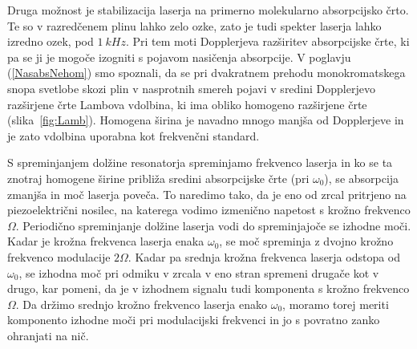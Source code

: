 Druga možnost je stabilizacija laserja na primerno molekularno absorpcijsko
črto. Te so v razredčenem plinu lahko zelo ozke, zato je tudi spekter 
laserja lahko izredno ozek, pod $1~\si{kHz}$. 
Pri tem moti Dopplerjeva razširitev absorpcijske črte,
ki pa se ji je mogoče izogniti s pojavom nasičenja 
absorpcije. V poglavju
(\ref{NasabsNehom}) smo spoznali, da se pri dvakratnem prehodu
monokromatskega snopa svetlobe skozi plin v nasprotnih smereh pojavi v
sredini Dopplerjevo razširjene črte Lambova vdolbina, ki 
ima obliko homogeno razširjene črte (slika~\ref{fig:Lamb}). 
Homogena širina je navadno mnogo manjša od Dopplerjeve in
je zato vdolbina uporabna kot frekvenčni standard. 

S spreminjanjem dolžine resonatorja spreminjamo frekvenco laserja in 
ko se ta znotraj homogene širine približa sredini absorpcijske črte (pri $\omega_0$), 
se absorpcija zmanjša in moč laserja poveča. To naredimo tako, da je 
eno od zrcal pritrjeno na piezoelektrični nosilec, na katerega vodimo
izmenično napetost s krožno frekvenco $\Omega$. Periodično spreminjanje dolžine
laserja vodi do spreminjajoče se izhodne moči. Kadar je krožna frekvenca laserja 
enaka $\omega_0$, se moč spreminja z dvojno krožno frekvenco modulacije $2\Omega$. 
Kadar pa srednja krožna frekvenca laserja odstopa od $\omega_0$, se izhodna moč 
pri odmiku v zrcala v eno stran spremeni drugače kot v drugo, kar pomeni, 
da je v izhodnem signalu tudi komponenta s krožno frekvenco $\Omega$. Da držimo 
srednjo krožno frekvenco laserja enako $\omega_0$, moramo torej meriti komponento 
izhodne moči pri modulacijski frekvenci in jo s povratno zanko ohranjati na nič.

